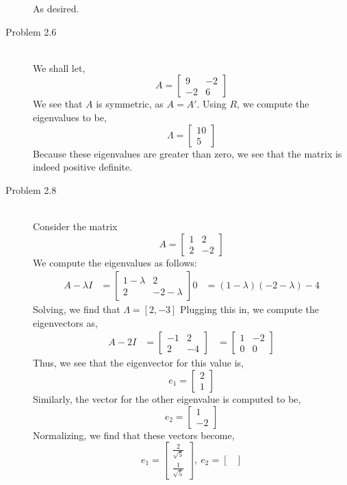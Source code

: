 \documentclass[letterpaper,10pt]{article}
\begin{document}
\begin{description}
As desired.
\item[Problem 2.6]\hfill\\
We shall let,
\[A=\begin{bmatrix}
9 & -2\\ -2 & 6
\end{bmatrix}\]
We see that $A$ is symmetric, as $A=A'$. Using $R$, we compute the eigenvalues to be,
\[\Lambda=\begin{bmatrix}
10\\5
\end{bmatrix}\]
Because these eigenvalues are greater than zero, we see that the matrix is indeed positive definite.
\item[Problem 2.8]\hfill\\
Consider the matrix
\[A=\begin{bmatrix}
1 & 2\\ 2 & -2
\end{bmatrix} \]
We compute the eigenvalues as follows:
\begin{align*}
A-\lambda I &= \begin{bmatrix}
1-\lambda & 2\\ 2 & -2-\lambda
\end{bmatrix}
0 &= (1-\lambda)(-2-\lambda)-4
\end{align*}
Solving, we find that $\Lambda=[2,-3]$
Plugging this in, we compute the eigenvectors as,
\begin{align*}
A-2I &= \begin{bmatrix}
-1 & 2 \\ 2 & -4
\end{bmatrix}
&=\begin{bmatrix}
1 & -2\\ 0 & 0
\end{bmatrix}
\end{align*}
Thus, we see that the eigenvector for this value is,
\[e_1=\begin{bmatrix}
2 \\1
\end{bmatrix} \]
Similarly, the vector for the other eigenvalue is computed to be,
\[e_2=\begin{bmatrix}
1 \\ -2
\end{bmatrix}\]
Normalizing, we find that these vectors become,
\[e_1=\begin{bmatrix}
\frac{2}{\sqrt{5}}\\ \frac{1}{\sqrt{5}}
\end{bmatrix},\ e_2=\begin{bmatrix}

\end{bmatrix}\]
\end{description}
\end{document}

